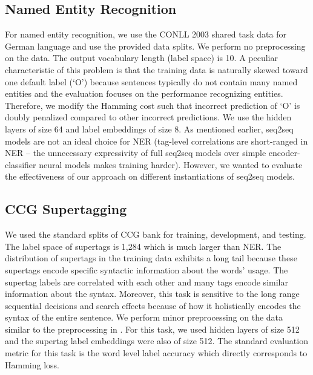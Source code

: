 \documentclass[letterpaper]{article} %
\begin{document}
\subsection{Named Entity Recognition}
For named entity recognition, we use the CONLL 2003 shared task data \cite{tjong2003introduction} for German language and use the provided data splits. We perform no preprocessing on the data. The output vocabulary length (label space) is 10. A peculiar characteristic of this problem is that the training data is naturally skewed toward one default label (`O') because sentences typically do not contain many named entities and the evaluation focuses on the performance recognizing entities. Therefore, we modify the Hamming cost such that incorrect prediction of `O' is doubly penalized compared to other incorrect predictions. We use the hidden layers of size 64 and label embeddings of size 8. As mentioned earlier, seq2seq models are not an ideal choice for NER (tag-level correlations are short-ranged in NER -- the unnecessary expressivity of full seq2seq models over simple encoder-classifier neural models makes training harder). However, we wanted to evaluate the effectiveness of our approach on different instantiations of seq2seq models.
\subsection{CCG Supertagging}
We used the standard splits of CCG bank \cite{hockenmaier2002acquiring} for training, development, and testing. The label space of supertags is 1,284 which is much larger than NER. The distribution of supertags in the training data exhibits a long tail because these supertags encode specific syntactic information about the words' usage. The supertag labels are correlated with each other and many tags encode similar information about the syntax. Moreover, this task is sensitive to the long range sequential decisions and search effects because of how it holistically encodes the syntax of the entire sentence. We perform minor preprocessing on the data similar to the preprocessing in \cite{vaswani2016supertagging}. For this task, we used hidden layers of size 512 and the supertag label embeddings were also of size 512. The standard evaluation metric for this task is the word level label accuracy which directly corresponds to Hamming loss.
\end{document}
